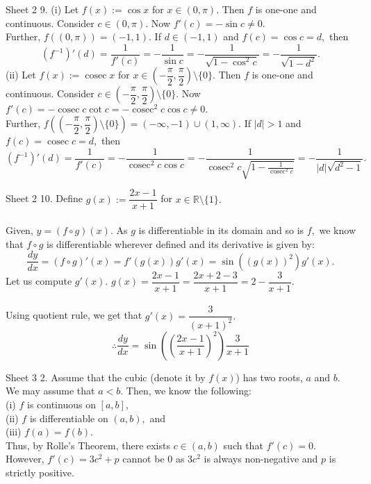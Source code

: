 \documentclass[handout, aspectratio=169]{beamer}
\newcommand{\cosec}{\operatorname{cosec}}
\begin{document}
\begin{frame}{Sheet 2}
	9. (i) Let $f(x) := \cos x$ for $x \in (0, \pi).$ Then $f$ is one-one and continuous. Consider $c \in (0, \pi).$ Now $f'(c) = -\sin c \neq 0.$\\
	Further, $f\left((0, \pi)\right) = (-1, 1).$ If $d \in (-1, 1)$ and $f(c) = \cos c = d,$ then
	\[(f^{-1})'(d) = \dfrac{1}{f'(c)} = -\dfrac{1}{\sin c} = - \dfrac{1}{\sqrt{1 - \cos^2c}} = - \dfrac{1}{\sqrt{1 - d^2}}.\]
	(ii) Let $f(x) := \cosec x$ for $x \in \left(-\dfrac{\pi}{2}, \dfrac{\pi}{2}\right)\setminus\{0\}.$ Then $f$ is one-one and continuous. Consider $c \in \left(-\dfrac{\pi}{2}, \dfrac{\pi}{2}\right)\setminus\{0\}.$ Now $f'(c) = -\cosec c\cot c = -\cosec^2 c\cos c \neq 0.$\\
	Further, $f\left(\left(-\dfrac{\pi}{2}, \dfrac{\pi}{2}\right)\setminus\{0\}\right) = (-\infty, -1)\cup(1, \infty).$ If $|d| > 1$ and $f(c) = \cosec c= d,$ then
	\[(f^{-1})'(d) = \dfrac{1}{f'(c)} = - \dfrac{1}{\cosec^2 c \cos c} = - \dfrac{1}{\cosec^2 c \sqrt{1 - \frac{1}{\cosec^2 c}}} = - \dfrac{1}{|d|\sqrt{d^2 - 1}}.\]
\end{frame}
\begin{frame}{Sheet 2}
	10. Define $g(x) := \dfrac{2x - 1}{x + 1}$ for $x \in \mathbb{R}\setminus\{1\}.$\\~\\
	Given, $y = (f\circ g)(x).$ As $g$ is differentiable in its domain and so is $f,$ we know that $f\circ g$ is differentiable wherever defined and its derivative is given by:
	\[\dfrac{dy}{dx} = (f\circ g)'(x) = f'(g(x))g'(x) = \sin\left((g(x))^2\right)g'(x).\]
	Let us compute $g'(x).$
	$g(x) = \dfrac{2x - 1}{x + 1} = \dfrac{2x + 2 - 3}{x + 1} = 2 - \dfrac{3}{x+1}.$\\~\\
	Using quotient rule, we get that $g'(x) = \dfrac{3}{(x+1)^2}.$
	\[\therefore \dfrac{dy}{dx} = \sin\left(\left(\dfrac{2x - 1}{x+1}\right)^2\right)\dfrac{3}{x+1}\]
\end{frame}
\begin{frame}{Sheet 3}
	2. Assume that the cubic (denote it by $f(x)$) has two roots, $a$ and $b.$ We may assume that $a < b.$ Then, we know the following:\\
	(i) $f$ is continuous on $[a, b],$\\
	(ii) $f$ is differentiable on $(a, b),$ and\\
	(iii) $f(a) = f(b).$\\
	Thus, by Rolle's Theorem, there exists $c \in (a, b)$ such that $f'(c) = 0.$\\
	However, $f'(c) = 3c^2 + p$ cannot be $0$ as $3c^2$ is always non-negative and $p$ is strictly positive.
\end{frame}
\end{document}
